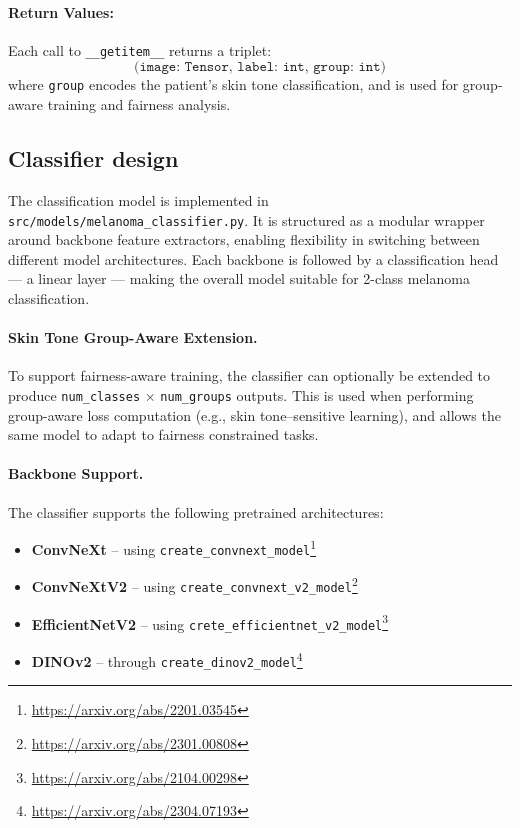\paragraph{Return Values:} Each call to \texttt{\_\_getitem\_\_} returns a triplet:
\[
\texttt{(image: Tensor, label: int, group: int)}
\]
where \texttt{group} encodes the patient’s skin tone classification, and is used for group-aware training and fairness analysis.

\subsection{Classifier design}

The classification model is implemented in \texttt{src/models/melanoma\_classifier.py}. It is structured as a modular wrapper around backbone feature extractors, enabling flexibility in switching between different model architectures. Each backbone is followed by a classification head — a linear layer — making the overall model suitable for 2-class melanoma classification.

\paragraph{Skin Tone Group-Aware Extension.}
To support fairness-aware training, the classifier can optionally be extended to produce \texttt{num\_classes} $\times$ \texttt{num\_groups} outputs. This is used when performing group-aware loss computation (e.g., skin tone–sensitive learning), and allows the same model to adapt to fairness constrained tasks.

\paragraph{Backbone Support.}
The classifier supports the following pretrained architectures:

\begin{itemize}
    \item \textbf{ConvNeXt} – using \texttt{create\_convnext\_model}\footnote{\url{https://arxiv.org/abs/2201.03545}}
    \item \textbf{ConvNeXtV2} – using \texttt{create\_convnext\_v2\_model}\footnote{\url{https://arxiv.org/abs/2301.00808}}
    \item \textbf{EfficientNetV2} – using \texttt{crete\_efficientnet\_v2\_model}\footnote{\url{https://arxiv.org/abs/2104.00298}}
    \item \textbf{DINOv2} – through \texttt{create\_dinov2\_model}\footnote{\url{https://arxiv.org/abs/2304.07193}}
\end{itemize}



